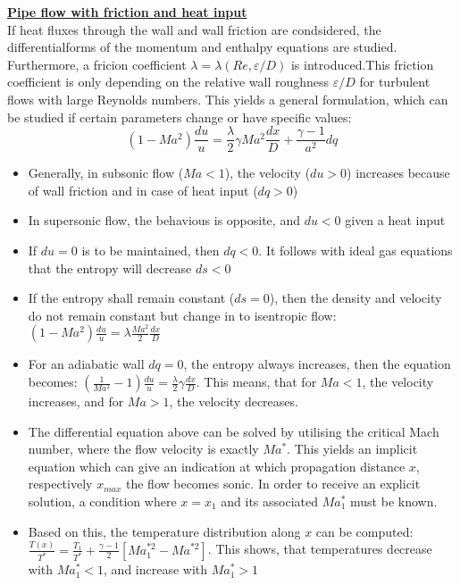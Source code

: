 \documentclass[8pt, landscape, fleqn]{scrartcl}
\begin{document}
\begin{multicols*}{3}
\underline{\textbf{Pipe flow with friction and heat input}} \\
If heat fluxes through the wall and wall friction are condsidered, the differentialforms of the momentum and enthalpy equations are studied. Furthermore, a fricion coefficient $\lambda = \lambda(Re, \varepsilon/D)$ is introduced.This friction coefficient is only depending on the relative wall roughness $\varepsilon/D$ for turbulent flows with large Reynolds numbers. This yields a general formulation, which can be studied if certain parameters change or have specific values:
\begin{equation*}
    (1-Ma^2)\frac{du}{u} = \frac{\lambda}{2}\gamma Ma^2 \frac{dx}{D} + \frac{\gamma-1}{a^2} dq
\end{equation*}
\begin{itemize}
    \item Generally, in subsonic flow ($Ma < 1$), the velocity ($du > 0$) increases because of wall friction and in case of heat input ($dq > 0$) 
    \item In supersonic flow, the behavious is opposite, and $du < 0$ given a heat input
    \item If $du = 0$ is to be maintained, then $dq < 0$. It follows with ideal gas equations that the entropy will decrease $ds < 0$
    \item If the entropy shall remain constant ($ds = 0$), then the density and velocity do not remain constant but change in to isentropic flow: $(1-Ma^2)\frac{du}{u}=\lambda \frac{Ma^2}{2}\frac{dx}{D}$ 
    \item For an adiabatic wall $dq=0$, the entropy always increases, then the equation becomes: $\left( \frac{1}{Ma^2}-1 \right)\frac{du}{u} = \frac{\lambda}{2}\gamma \frac{dx}{D}$. This means, that for $Ma <1$, the velocity increases, and for $Ma > 1$, the velocity decreases. 
    \item The differential equation above can be solved by utilising the critical Mach number, where the flow velocity is exactly $Ma^*$. This yields an implicit equation which can give an indication at which propagation distance $x$, respectively $x_{max}$ the flow becomes sonic. In order to receive an explicit solution, a condition where $x=x_1$ and its associated $Ma_1^*$ must be known.
    \item Based on this, the temperature distribution along $x$ can be computed: $\frac{T(x)}{T^*} = \frac{T_1}{T^*} + \frac{\gamma-1}{2}\left[Ma_1^{*2}-Ma^{*2}\right]$. This shows, that temperatures decrease with $Ma_1^* < 1$, and increase with $Ma_1^* > 1$
\end{itemize}


\end{multicols*}
\end{document}
